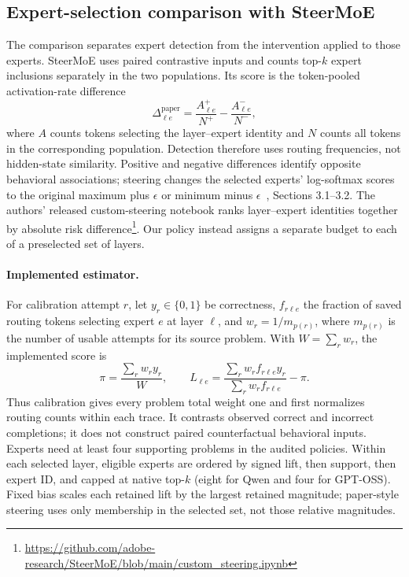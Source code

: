 \subsection{Expert-selection comparison with SteerMoE}
\label{sec:expert-selection-audit}

The comparison separates expert detection from the intervention applied to
those experts. SteerMoE uses paired contrastive inputs and counts top-$k$
expert inclusions separately in the two populations. Its score is the
token-pooled activation-rate difference
\begin{equation}
\Delta_{\ell e}^{\mathrm{paper}} =
\frac{A_{\ell e}^{+}}{N^{+}}-\frac{A_{\ell e}^{-}}{N^{-}},
\end{equation}
where $A$ counts tokens selecting the layer--expert identity and $N$ counts
all tokens in the corresponding population. Detection therefore uses routing
frequencies, not hidden-state similarity. Positive and negative differences
identify opposite behavioral associations; steering changes the selected
experts' log-softmax scores to the original maximum plus $\epsilon$ or minimum
minus $\epsilon$~\cite{fayyaz2025steermoe}, Sections 3.1--3.2.
The authors' released custom-steering notebook ranks layer--expert identities
together by absolute risk difference\footnote{\url{https://github.com/adobe-research/SteerMoE/blob/main/custom_steering.ipynb}}.
Our policy instead assigns a separate budget to each of a preselected set
of layers.

\paragraph{Implemented estimator.}
For calibration attempt $r$, let $y_r\in\{0,1\}$ be correctness,
$f_{r\ell e}$ the fraction of saved routing tokens selecting expert $e$ at
layer $\ell$, and $w_r=1/m_{p(r)}$, where $m_{p(r)}$ is the number of usable
attempts for its source problem. With $W=\sum_r w_r$, the implemented score is
\begin{equation}
\pi=\frac{\sum_r w_r y_r}{W},\qquad
L_{\ell e}=\frac{\sum_r w_r f_{r\ell e}y_r}
                       {\sum_r w_r f_{r\ell e}}-\pi.
\end{equation}
Thus calibration gives every problem total weight one and first normalizes
routing counts within each trace. It contrasts observed correct and incorrect
completions; it does not construct paired counterfactual behavioral inputs.
Experts need at least four supporting problems in the audited policies.
Within each selected layer, eligible experts are ordered by signed lift,
then support, then expert ID, and capped at native top-$k$
(eight for Qwen and four for GPT-OSS). Fixed bias scales each
retained lift by the largest retained magnitude; paper-style steering uses
only membership in the selected set, not those relative magnitudes.

